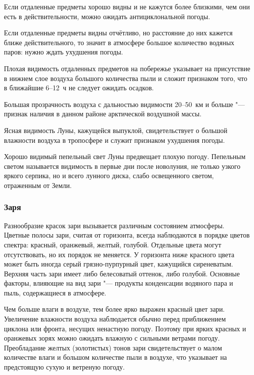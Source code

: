  Если отдаленные предметы хорошо видны и не кажутся более
близкими, чем они есть в действительности, можно ожидать
антициклональной погоды.

 Если отдаленные предметы видны отчётливо, но расстояние до них
кажется ближе действительного, то значит в атмосфере большое
количество водяных паров: нужно ждать ухудшения погоды.

 Плохая видимость отдаленных предметов на побережье указывает
на присутствие в нижнем слое воздуха большого количества пыли и сложит
признаком того, что в ближайшие 6--12~ч не следует ожидать осадков.

 Большая прозрачность воздуха с дальностью видимости 20--50~км
и больше "--- признак наличия в данном районе арктической воздушной
массы.

 Ясная видимость Луны, кажущейся выпуклой, свидетельствует о
большой влажности воздуха в тропосфере и служит признаком ухудшения
погоды.

 Хорошо видимый пепельный свет Луны предвещает плохую
погоду. Пепельным светом называется видимость в первые дни после
новолуния, не только узкого яркого серпика, но и всего лунного диска,
слабо освещенного светом, отраженным от Земли.

\subsubsection{Заря}

Разнообразие красок зари вызывается различным состоянием
атмосферы. Цветные полосы зари, считая от горизонта, всегда
наблюдаются в порядке цветов спектра: красный, оранжевый, желтый,
голубой. Отдельные цвета могут отсутствовать, но их порядок не
меняется. У горизонта ниже красного цвета может быть иногда серый
грязно-пурпурный цвет, кажущийся сиреневатым. Верхняя часть зари имеет
либо белесоватый оттенок, либо голубой. Основные факторы, влияющие на
вид зари "--- продукты конденсации водяного пара и пыль, содержащиеся в
атмосфере.

Чем больше влаги в воздухе, тем более ярко выражен красный цвет
зари. Увеличение влажности воздуха наблюдается обычно перед
приближением циклона или фронта, несущих ненастную погоду. Поэтому при
ярких красных и оранжевых зорях можно ожидать влажную с сильными
ветрами погоду. Преобладание желтых (золотистых) тонов зари
свидетельствует о малом количестве влаги и большом количестве пыли в
воздухе, что указывает на предстоящую сухую и ветреную погоду.

